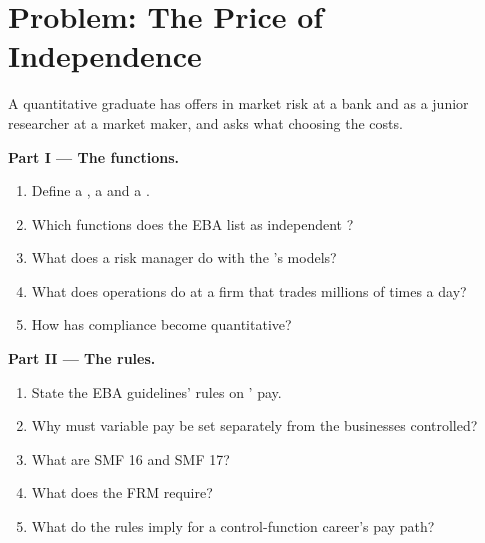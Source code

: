 \section{Problem: The Price of Independence}

\begin{problem}\label{pb:in:risk-operations-product-control-and-compliance:1}
A quantitative graduate has offers in market risk at a bank and as a junior researcher at a market maker, and asks what
choosing the  costs.

\medskip\noindent\textbf{Part I --- The functions.}
\begin{enumerate}
\item Define a , a  and a .
\item Which functions does the EBA list as independent ?
\item What does a risk manager do with the 's models?
\item What does operations do at a firm that trades millions of times a day?
\item How has compliance become quantitative?
\end{enumerate}

\medskip\noindent\textbf{Part II --- The rules.}
\begin{enumerate}[resume]
\item State the EBA guidelines' rules on ' pay.
\item Why must variable pay be set separately from the businesses controlled?
\item What are SMF 16 and SMF 17?
\item What does the FRM require?
\item What do the rules imply for a control-function career's pay path?
\end{enumerate}


\end{problem}
